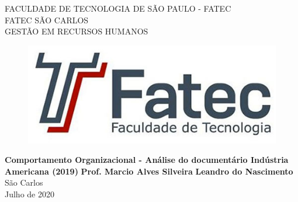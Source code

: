 \documentclass[12pt,a4paper,oneside]{article}
\begin{document}
 


\begin{titlepage}
\centering
\textsc{\large FACULDADE DE TECNOLOGIA DE SÃO PAULO - FATEC}\\[0.2cm]
\textsc{\large FATEC SÃO CARLOS}\\[0.2cm]
\textsc{\large GESTÃO EM RECURSOS HUMANOS}\\[0.2cm]
\begin{figure} [H] 
\centering
\includegraphics[scale=0.35]{Fig/Logo Fatec.jpg} 
\end{figure}
\vfill
{ \LARGE \bf Comportamento Organizacional - Análise do documentário Indústria Americana (2019) }
\vfill
{ \large \bf Prof. Marcio Alves Silveira }
\vfill
{ \large \bf Leandro do Nascimento}
\vfill
{\large São Carlos\\Julho de 2020 }
\end{titlepage}
\thispagestyle{empty} %


\newpage
\thispagestyle{empty} %


\cleardoublepage        %
\setcounter{page}{1}    %
\end{document}
